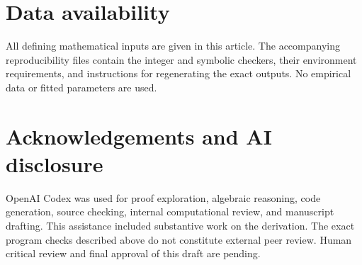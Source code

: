 \documentclass[11pt,a4paper]{article}
\numberwithin{equation}{section}
\begin{document}
\section*{Data availability}
All defining mathematical inputs are given in this article. The accompanying
reproducibility files contain the integer and symbolic checkers, their
environment requirements, and instructions for regenerating the exact
outputs. No empirical data or fitted parameters are used.

\section*{Acknowledgements and AI disclosure}
OpenAI Codex was used for proof exploration, algebraic reasoning, code
generation, source checking, internal computational review, and manuscript
drafting. This assistance included substantive work on the derivation.
The exact program checks described above do not constitute external peer
review. Human critical review and final approval of this draft are pending.



\end{document}
